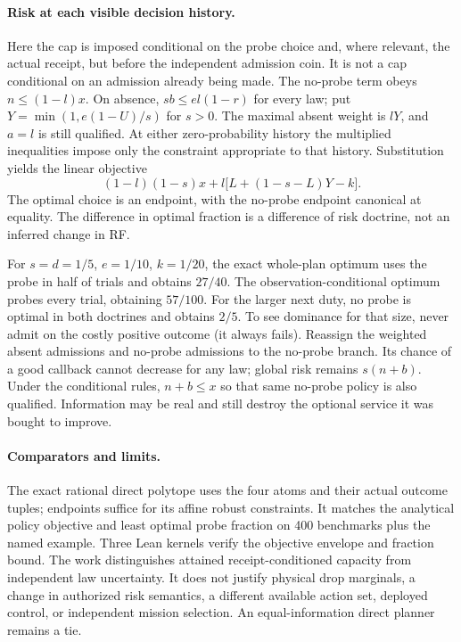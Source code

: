 \documentclass{article}
\begin{document}
\paragraph{Risk at each visible decision history.}
Here the cap is imposed conditional on the probe choice and,
where relevant, the actual receipt, but before the independent
admission coin. It is not a cap conditional on an admission
already being made. The no-probe term obeys $n\le (1-l)x$.
On absence, $sb\le e l (1-r)$ for every law; put
$Y=\min(1,e(1-U)/s)$ for $s>0$. The maximal absent weight is $lY$,
and $a=l$ is still qualified. At either zero-probability
history the multiplied inequalities impose only the constraint
appropriate to that history. Substitution yields the linear
objective
\[
        (1-l)(1-s)x+l\big[L+(1-s-L)Y-k\big].
\]
The optimal choice is an endpoint, with the no-probe endpoint
canonical at equality. The difference in optimal fraction is a
difference of risk doctrine, not an inferred change in RF.

For $s=d=1/5$, $e=1/10$, $k=1/20$, the exact whole-plan optimum
uses the probe in half of trials and obtains $27/40$.
The observation-conditional optimum probes every trial, obtaining
$57/100$. For the larger next duty, no probe is optimal in both
doctrines and obtains $2/5$. To see dominance for that size,
never admit on the costly positive outcome (it always fails).
Reassign the weighted absent admissions and no-probe admissions
to the no-probe branch. Its chance of a good callback cannot
decrease for any law; global risk remains $s(n+b)$.
Under the conditional rules, $n+b\le x$ so that same no-probe
policy is also qualified. Information may be real and still
destroy the optional service it was bought to improve.

\paragraph{Comparators and limits.}
The exact rational direct polytope uses the four atoms and their
actual outcome tuples; endpoints suffice for its affine robust
constraints. It matches the analytical policy objective and least
optimal probe fraction on 400 benchmarks plus the named example.
Three Lean kernels verify the objective envelope and fraction bound.
The work distinguishes attained receipt-conditioned capacity from
independent law uncertainty. It does not justify physical drop
marginals, a change in authorized risk semantics, a different
available action set, deployed control, or independent mission
selection. An equal-information direct planner remains a tie.
\end{document}
